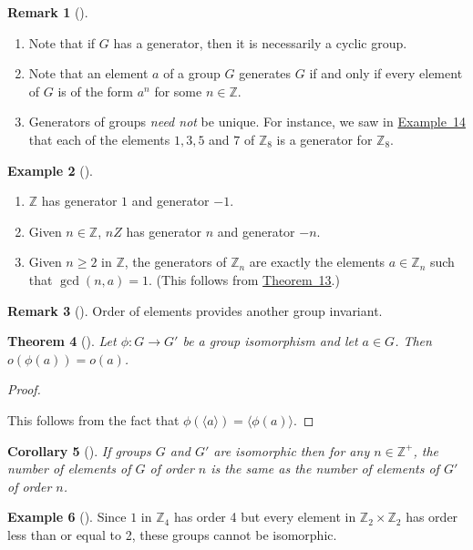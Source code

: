 \documentclass[10pt,openany,oneside]{book}
\theoremstyle{plain}
\newtheorem{theorem}{Theorem}[section]
\newtheorem{corollary}[theorem]{Corollary}
\theoremstyle{definition}
\theoremstyle{definition}
\newtheorem{remark}[theorem]{Remark}
\theoremstyle{definition}
\newtheorem{example}[theorem]{Example}
\theoremstyle{definition}
\numberwithin{equation}{section}
\def\Z{\mathbb{Z}}
\begin{document}
\begin{remark}[]\label{remark-23}
\leavevmode%
\begin{enumerate}
\item\hypertarget{li-261}{}Note that if \(G\) has a generator, then it is necessarily a cyclic group.%
\item\hypertarget{li-262}{}Note that an element \(a\) of a group \(G\) generates \(G\) if and only if every element of \(G\) is of the form \(a^n\) for some \(n\in \Z\).%
\item\hypertarget{li-263}{}Generators of groups \emph{need not} be unique.  For instance, we saw in \hyperref[csexs]{Example~14} that each of the elements \(1,3,5\) and \(7\) of \(\Z_8\) is a generator for \(\Z_8\).%
\end{enumerate}
%
\end{remark}
\begin{example}[]\label{example-43}
\leavevmode%
\begin{enumerate}
\item\hypertarget{li-264}{}\(\Z\) has generator \(1\) and generator \(-1\).%
\item\hypertarget{li-265}{}Given \(n\in \Z\), \(nZ\) has generator \(n\) and generator \(-n\).%
\item\hypertarget{li-266}{}Given \(n\geq 2\) in \(\Z\), the generators of \(\Z_n\) are exactly  the elements \(a\in \Z_n\) such that \(\gcd(n,a)=1\). (This follows from \hyperref[znorders]{Theorem~13}.)%
\end{enumerate}
%
\end{example}
\begin{remark}[]\label{remark-24}
Order of elements provides another group invariant.%
\end{remark}
\begin{theorem}[{}]\label{ophia}
Let \(\phi:G\to G'\) be a group isomorphism and let \(a\in G\). Then \(o(\phi(a))=o(a)\).%
\end{theorem}
\begin{proof}\hypertarget{proof-24}{}
This follows from the fact that \(\phi(\langle a\rangle )=\langle \phi(a)\rangle\).%
\end{proof}
\begin{corollary}[{}]\label{corollary-4}
If groups \(G\) and \(G'\) are isomorphic then for any \(n\in \Z^+\), the number of elements of \(G\) of order \(n\) is the same as the number of elements of \(G'\) of order \(n\).%
\end{corollary}
\begin{example}[]\label{example-44}
Since \(1\) in \(\Z_4\) has order 4 but every element in \(\Z_2 \times \Z_2\) has order less than or equal to 2, these groups cannot be isomorphic.%
\end{example}
\end{document}
